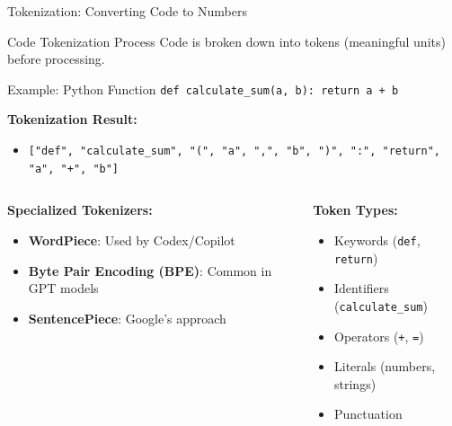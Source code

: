 \documentclass{beamer}
\begin{document}
\begin{frame}[t]{Tokenization: Converting Code to Numbers}
    \begin{block}{Code Tokenization Process}
        Code is broken down into tokens (meaningful units) before processing.
    \end{block}
    
    \begin{exampleblock}{Example: Python Function}
        \texttt{def calculate\_sum(a, b):\ return a + b}
    \end{exampleblock}
    
    \textbf{Tokenization Result:}
    \begin{itemize}
        \item \texttt{["def", "calculate\_sum", "(", "a", ",", "b", ")", ":", "return", "a", "+", "b"]}
    \end{itemize}
    
    \begin{columns}[t]
        \begin{column}{0.5\textwidth}
            \textbf{Specialized Tokenizers:}
            \begin{itemize}
                \item \textbf{WordPiece}: Used by Codex/Copilot
                \item \textbf{Byte Pair Encoding (BPE)}: Common in GPT models
                \item \textbf{SentencePiece}: Google's approach
            \end{itemize}
        \end{column}
        \begin{column}{0.5\textwidth}
            \textbf{Token Types:}
            \begin{itemize}
                \item Keywords (\texttt{def}, \texttt{return})
                \item Identifiers (\texttt{calculate\_sum})
                \item Operators (\texttt{+}, \texttt{=})
                \item Literals (numbers, strings)
                \item Punctuation
            \end{itemize}
        \end{column}
    \end{columns}
\end{frame}
\end{document}
